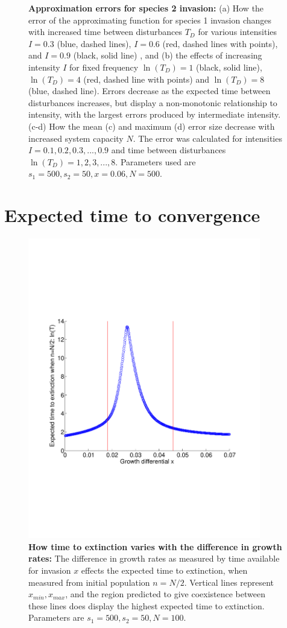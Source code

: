 \begin{figure}[th]
   \caption[Approximation errors for species 2 invasion]{\textbf{Approximation errors for species 2 invasion: }(a) How the error of the approximating function for species 1 invasion changes with increased time between disturbances $T_D$ for various intensities $I=0.3$ (blue, dashed lines), $I=0.6$ (red, dashed lines with points), and $I=0.9$ (black, solid line) , and (b) the effects of increasing intensity $I$ for fixed frequency $\ln(T_D)=1$ (black, solid line), $\ln(T_D)=4$ (red, dashed line with points) and $\ln(T_D)=8$ (blue, dashed line). Errors decrease as the expected time between disturbances increases, but display a non-monotonic relationship to intensity, with the largest errors produced by intermediate intensity. (c-d) How the mean (c) and maximum (d) error size decrease with increased system capacity $N$. The error was calculated for intensities $I=0.1,0.2,0.3,...,0.9$ and time between disturbances $\ln(T_D)=1,2,3,...,8.$ Parameters used are $s_1=500,s_2=50,x=0.06,N=500$.}
 \label{fig:approxerrortot}
\end{figure}


 \section{Expected time to convergence}
 \label{app2b}
 \begin{figure}[th]
 \includegraphics[width=4in]{ttevx.pdf}
 \caption[How time to extinction varies with the difference in growth rates]{\textbf{How time to extinction varies with the difference in growth rates:} The difference in growth rates as measured by time available for invasion $x$ effects the expected time to extinction, when measured from initial population $n=N/2$. Vertical lines represent $x_{min},x_{max}$, and the region predicted to give coexistence between these lines does display the highest expected time to extinction. Parameters are $s_1=500,s_2=50,N=100$.}
 \label{fig:ttevx}
 \end{figure}
 
